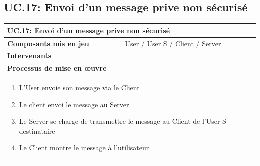 \documentclass[a4paper,11pt,french]{article}
\begin{document}
\subsection{UC.17: Envoi d'un message prive non sécurisé}
\begin{center}
	\vspace*{0.7cm}
	\begin{tabularx}{16cm}{|l|X|}
	\hline
	\multicolumn{2}{|l|}{\textbf{UC.17: Envoi d'un message prive non sécurisé}}\\
	\hline
	\textbf{Composants mis en jeu} & User / User S / Client / Server \\
	\hline
	\textbf{Intervenants} &   \\
	\hline
	\multicolumn{2}{|l|}{\textbf{Processus de mise en \oe uvre}}\\
	\hline
	\multicolumn{2}{|p{15cm}|}{\begin{enumerate}\item L'User envoie son message via le Client \item Le client envoi le message au Server \item Le Server se charge de transmettre le message au Client de l'User S destinataire \item Le Client montre le message à l'utilisateur \end{enumerate}}\\
	\hline
	\end{tabularx}
\end{center}

\end{document}
